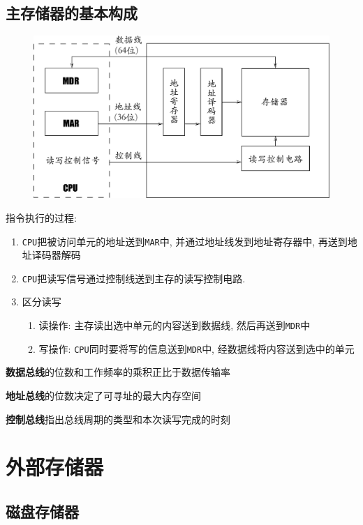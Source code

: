 \subsection{主存储器的基本构成}
\begin{figure}[H]
\centering
\includegraphics[scale=.5]{img/figure54.pdf}
\end{figure}\par
指令执行的过程:
\begin{enumerate}
\item \verb|CPU|把被访问单元的地址送到\verb|MAR|中, 并通过地址线发到地址寄存器中, 再送到地址译码器解码
\item \verb|CPU|把读写信号通过控制线送到主存的读写控制电路.
\item 区分读写
\begin{enumerate}
\item 读操作: 主存读出选中单元的内容送到数据线, 然后再送到\verb|MDR|中
\item 写操作: \verb|CPU|同时要将写的信息送到\verb|MDR|中, 经数据线将内容送到选中的单元
\end{enumerate}
\end{enumerate}\par
\textbf{数据总线}的位数和工作频率的乘积正比于数据传输率 \par
\textbf{地址总线}的位数决定了可寻址的最大内存空间 \par
\textbf{控制总线}指出总线周期的类型和本次读写完成的时刻 \par
\section{外部存储器}
\subsection{磁盘存储器}
